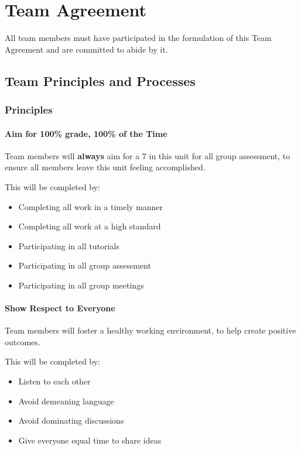 \documentclass[12pt, a4paper, onecolumn]{article}
\begin{document}
\newpage
\section{Team Agreement}
All team members must have participated in the formulation of
this Team Agreement and are committed to abide by it.

\subsection{Team Principles and Processes}

\subsubsection{Principles}
\paragraph{Aim for 100\% grade, 100\% of the Time}
Team members will \textbf{always} aim for a 7 in this unit for all group
assessment, to ensure all members leave this unit feeling accomplished.

This will be completed by:
\begin{itemize}
  \setlength\itemsep{1px}
  \item Completing all work in a timely manner
  \item Completing all work at a high standard
  \item Participating in all tutorials
  \item Participating in all group assessment
  \item Participating in all group meetings
\end{itemize}

\paragraph{Show Respect to Everyone}
Team members will foster a healthy working environment, to help
create positive outcomes.

This will be completed by:
\begin{itemize}
  \setlength\itemsep{1px}
  \item Listen to each other
  \item Avoid demeaning language
  \item Avoid dominating discussions
  \item Give everyone equal time to share ideas
\end{itemize}
\end{document}
